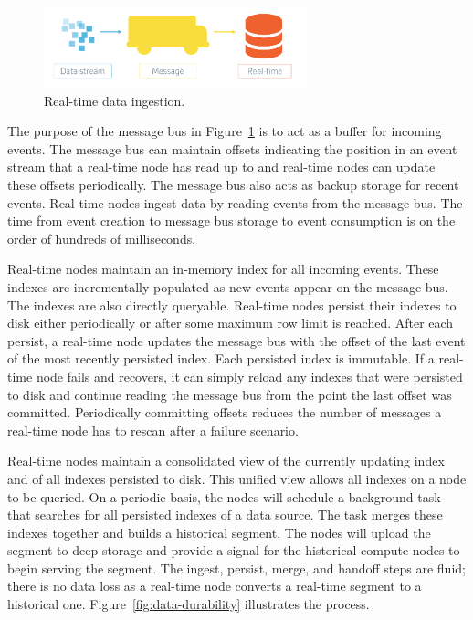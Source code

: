 \documentclass{vldb}
\begin{document}
\begin{figure}
\centering
\includegraphics[width = 3in]{druid_message_bus}
\caption{Real-time data ingestion.}
\label{fig:data-ingestion}
\end{figure}

The purpose of the message bus in Figure~\ref{fig:data-ingestion} is to act as a buffer for incoming events. The message bus can maintain offsets indicating the position in an event stream that a real-time node has read up to and real-time nodes can update these offsets periodically. The message bus also acts as backup storage for recent events. Real-time nodes ingest data by reading events from the message bus. The time from event creation to message bus storage to event consumption is on the order of hundreds of milliseconds.

Real-time nodes maintain an in-memory index for all incoming events. These indexes are incrementally populated as new events appear on the message bus. The indexes are also directly queryable. Real-time nodes persist their indexes to disk either periodically or after some maximum row limit is reached. After each persist, a real-time node updates the message bus with the offset of the last event of the most recently persisted index. Each persisted index is immutable. If a real-time node fails and recovers, it can simply reload any indexes that were persisted to disk and continue reading the message bus from the point the last offset was committed. Periodically committing offsets reduces the number of messages a real-time node has to rescan after a failure scenario.

Real-time nodes maintain a consolidated view of the currently updating index and of all indexes persisted to disk. This unified view allows all indexes on a node to be queried. On a periodic basis, the nodes will schedule a background task that searches for all persisted indexes of a data source. The task merges these indexes together and builds a historical segment. The nodes will upload the segment to deep storage and provide a signal for the historical compute nodes to begin serving the segment. The ingest, persist, merge, and handoff steps are fluid; there is no data loss as a real-time node converts a real-time segment to a historical one. Figure~\ref{fig:data-durability} illustrates the process.
\end{document}
